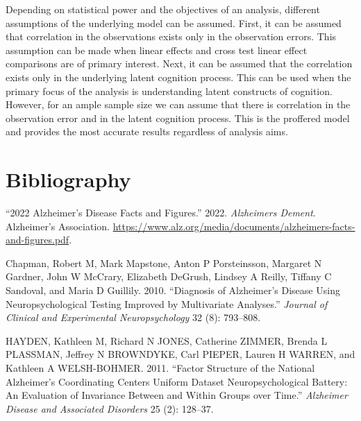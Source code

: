 \documentclass[
]{article}
\newlength{\cslhangindent}
\newlength{\cslentryspacingunit} %
\newenvironment{CSLReferences}[2] %
 {%
  \setlength{\parindent}{0pt}
  \ifodd #1
  \let\oldpar\par
  \def\par{\hangindent=\cslhangindent\oldpar}
  \fi
  \setlength{\parskip}{#2\cslentryspacingunit}
 }%
 {}
\begin{document}
Depending on statistical power and the objectives of an analysis, different assumptions of the underlying model can be assumed. First, it can be assumed that correlation in the observations exists only in the observation errors. This assumption can be made when linear effects and cross test linear effect comparisons are of primary interest. Next, it can be assumed that the correlation exists only in the underlying latent cognition process. This can be used when the primary focus of the analysis is understanding latent constructs of cognition. However, for an ample sample size we can assume that there is correlation in the observation error and in the latent cognition process. This is the proffered model and provides the most accurate results regardless of analysis aims.

\newpage{}

\hypertarget{bibliography}{%
\section*{Bibliography}\label{bibliography}}

\hypertarget{refs}{}
\begin{CSLReferences}{1}{0}
\leavevmode{}%
{``2022 Alzheimer's Disease Facts and Figures.''} 2022. \emph{Alzheimers Dement}. Alzheimer's Association. \url{https://www.alz.org/media/documents/alzheimers-facts-and-figures.pdf}.

\leavevmode{}%
Chapman, Robert M, Mark Mapstone, Anton P Porsteinsson, Margaret N Gardner, John W McCrary, Elizabeth DeGrush, Lindsey A Reilly, Tiffany C Sandoval, and Maria D Guillily. 2010. {``Diagnosis of Alzheimer's Disease Using Neuropsychological Testing Improved by Multivariate Analyses.''} \emph{Journal of Clinical and Experimental Neuropsychology} 32 (8): 793--808.

\leavevmode{}%
HAYDEN, Kathleen M, Richard N JONES, Catherine ZIMMER, Brenda L PLASSMAN, Jeffrey N BROWNDYKE, Carl PIEPER, Lauren H WARREN, and Kathleen A WELSH-BOHMER. 2011. {``Factor Structure of the National Alzheimer's Coordinating Centers Uniform Dataset Neuropsychological Battery: An Evaluation of Invariance Between and Within Groups over Time.''} \emph{Alzheimer Disease and Associated Disorders} 25 (2): 128--37.

\end{CSLReferences}
\end{document}
